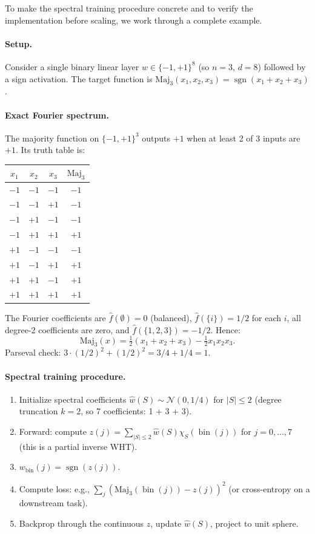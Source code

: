 \documentclass[12pt,a4paper]{article}
\theoremstyle{plain}
\theoremstyle{definition}
\theoremstyle{remark}
\newcommand{\pmone}{\{-1,+1\}}
\newcommand{\fhat}{\widehat{f}}
\newcommand{\what}{\widehat{w}}
\newcommand{\sgn}{\operatorname{sgn}}
\DeclareMathOperator{\bin}{bin}
\begin{document}
To make the spectral training procedure concrete and to verify the implementation before scaling, we work through a complete example.

\paragraph{Setup.}
Consider a single binary linear layer $w \in \pmone^8$ (so $n = 3$, $d = 8$) followed by a sign activation. The target function is $\text{Maj}_3(x_1, x_2, x_3) = \sgn(x_1 + x_2 + x_3)$.

\paragraph{Exact Fourier spectrum.}
The majority function on $\pmone^3$ outputs $+1$ when at least 2 of 3 inputs are $+1$. Its truth table is:
\begin{center}
\begin{tabular}{cccc}
\toprule
$x_1$ & $x_2$ & $x_3$ & $\text{Maj}_3$ \\
\midrule
$-1$ & $-1$ & $-1$ & $-1$ \\
$-1$ & $-1$ & $+1$ & $-1$ \\
$-1$ & $+1$ & $-1$ & $-1$ \\
$-1$ & $+1$ & $+1$ & $+1$ \\
$+1$ & $-1$ & $-1$ & $-1$ \\
$+1$ & $-1$ & $+1$ & $+1$ \\
$+1$ & $+1$ & $-1$ & $+1$ \\
$+1$ & $+1$ & $+1$ & $+1$ \\
\bottomrule
\end{tabular}
\end{center}

The Fourier coefficients are $\fhat(\emptyset) = 0$ (balanced), $\fhat(\{i\}) = 1/2$ for each $i$, all degree-2 coefficients are zero, and $\fhat(\{1,2,3\}) = -1/2$. Hence:
\begin{equation}
    \text{Maj}_3(x) = \tfrac{1}{2}(x_1 + x_2 + x_3) - \tfrac{1}{2}x_1 x_2 x_3.
\end{equation}
Parseval check: $3 \cdot (1/2)^2 + (1/2)^2 = 3/4 + 1/4 = 1$. \checkmark

\paragraph{Spectral training procedure.}
\begin{enumerate}
    \item Initialize spectral coefficients $\what(S) \sim \mathcal{N}(0, 1/4)$ for $|S| \leq 2$ (degree truncation $k=2$, so 7 coefficients: 1 + 3 + 3).
    \item Forward: compute $z(j) = \sum_{|S| \leq 2} \what(S) \chi_S(\bin(j))$ for $j = 0, \ldots, 7$ (this is a partial inverse WHT).
    \item $w_{\text{bin}}(j) = \sgn(z(j))$.
    \item Compute loss: e.g., $\sum_j (\text{Maj}_3(\bin(j)) - z(j))^2$ (or cross-entropy on a downstream task).
    \item Backprop through the continuous $z$, update $\what(S)$, project to unit sphere.
\end{enumerate}
\end{document}
